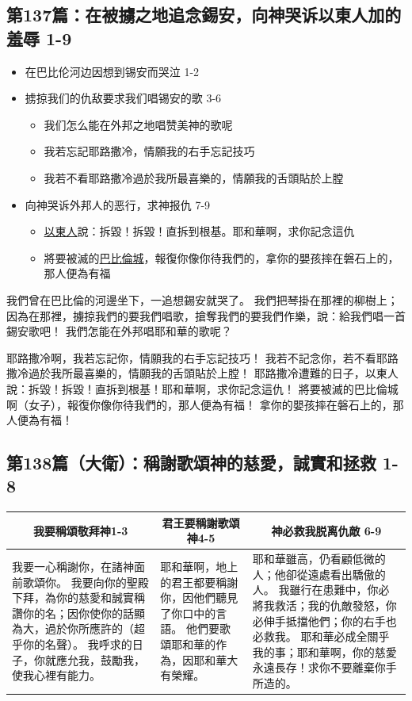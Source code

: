 \subsection{第137篇：在被擄之地追念錫安，向神哭诉以東人加的羞辱 1-9}
\begin{itemize}
\itemsep-.45em 
\item 在巴比伦河边因想到锡安而哭泣 1-2
\item 掳掠我们的仇敌要求我们唱锡安的歌 3-6
\begin{itemize}
\itemsep-.45em 
\item 我们怎么能在外邦之地唱赞美神的歌呢
\item 我若忘記耶路撒冷，情願我的右手忘記技巧
\item 我若不看耶路撒冷過於我所最喜樂的，情願我的舌頭貼於上膛
\end{itemize}
\item 向神哭诉外邦人的恶行，求神报仇 7-9
\begin{itemize}
\itemsep-.45em 
\item \underline{以東人}說：拆毀！拆毀！直拆到根基。耶和華啊，求你記念這仇
\item 將要被滅的\underline{巴比倫城}，報復你像你待我們的，拿你的嬰孩摔在磐石上的，那人便為有福
\end{itemize}
\end{itemize}
我們曾在巴比倫的河邊坐下，一追想錫安就哭了。
我們把琴掛在那裡的柳樹上；
因為在那裡，擄掠我們的要我們唱歌，搶奪我們的要我們作樂，說：給我們唱一首錫安歌吧！
我們怎能在外邦唱耶和華的歌呢？

耶路撒冷啊，我若忘記你，情願我的右手忘記技巧！
我若不記念你，若不看耶路撒冷過於我所最喜樂的，情願我的舌頭貼於上膛！
耶路撒冷遭難的日子，以東人說：拆毀！拆毀！直拆到根基！耶和華啊，求你記念這仇！
將要被滅的巴比倫城啊（女子），報復你像你待我們的，那人便為有福！
拿你的嬰孩摔在磐石上的，那人便為有福！

\subsection{第138篇（大衛）：稱謝歌頌神的慈愛，誠實和拯救 1-8}
\begin{table}[H]
\centering
\begin{tabular}{p{6.5cm}|p{3.5cm}|p{7.2500cm}}\hline\hline
\multicolumn{1}{c|}{我要稱頌敬拜神1-3}&\multicolumn{1}{c|}{君王要稱謝歌頌神4-5}&\multicolumn{1}{c}{神必救我脱离仇敵 6-9}\\\hline
我要一心稱謝你，在諸神面前歌頌你。
我要向你的聖殿下拜，為你的慈愛和誠實稱讚你的名；因你使你的話顯為大，過於你所應許的（超乎你的名聲）。
我呼求的日子，你就應允我，鼓勵我，使我心裡有能力。
&耶和華啊，地上的君王都要稱謝你，因他們聽見了你口中的言語。
他們要歌頌耶和華的作為，因耶和華大有榮耀。
&耶和華雖高，仍看顧低微的人；他卻從遠處看出驕傲的人。
我雖行在患難中，你必將我救活；我的仇敵發怒，你必伸手抵擋他們；你的右手也必救我。
耶和華必成全關乎我的事；耶和華啊，你的慈愛永遠長存！求你不要離棄你手所造的。\\\hline
\end{tabular}
\end{table} 


